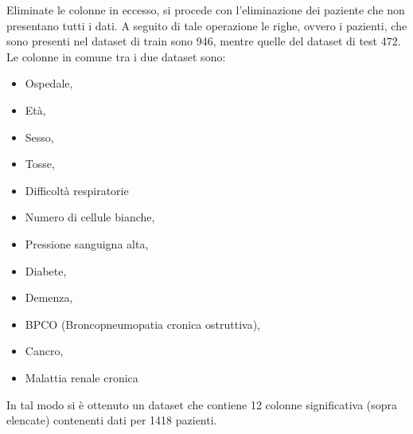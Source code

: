 Eliminate le colonne in eccesso, si procede con l'eliminazione dei paziente che non presentano tutti i dati.
A seguito di tale operazione le righe, ovvero i pazienti, che sono presenti nel dataset di train sono 946, mentre quelle del dataset di test
472.
Le colonne in comune tra i due dataset sono:
\begin{itemize}
    \item Ospedale, 
    \item Età, 
    \item Sesso,
    \item Tosse, 
    \item Difficoltà respiratorie
    \item Numero di cellule bianche,
    \item Pressione sanguigna alta,  
    \item Diabete,
    \item Demenza,  
    \item BPCO (Broncopneumopatia cronica ostruttiva),
    \item Cancro, 
    \item Malattia renale cronica
\end{itemize}

In tal modo si è ottenuto un dataset che contiene 12 colonne significativa (sopra elencate) contenenti dati per 
1418 pazienti.

